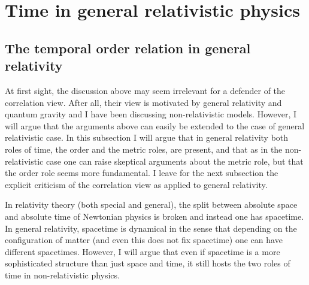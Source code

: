 \documentclass[12 pt]{article}
\begin{document}
\section{Time in general relativistic physics} \label{sect_relativistic}

\subsection{The temporal order relation in general relativity}

At first sight, the discussion above may seem irrelevant for a defender of the correlation view. After all, their view is motivated by general relativity and quantum gravity and I have been discussing non-relativistic models. However, I will argue that the arguments above can easily be extended to the case of general relativistic case. In this subsection I will argue that in general relativity both roles of time, the order and the metric roles, are present, and that as in the non-relativistic case one can raise skeptical arguments about the metric role, but that the order role seems more fundamental. I leave for the next subsection the explicit criticism of the correlation view as applied to general relativity.

In relativity theory (both special and general), the split between absolute space and absolute time of Newtonian physics is broken and instead one has spacetime. In general relativity, spacetime is dynamical in the sense that depending on the configuration of matter (and even this does not fix spacetime) one can have different spacetimes. However, I will argue that even if spacetime is a more sophisticated structure than just space and time, it still hosts the two roles of time in non-relativistic physics.
\end{document}
